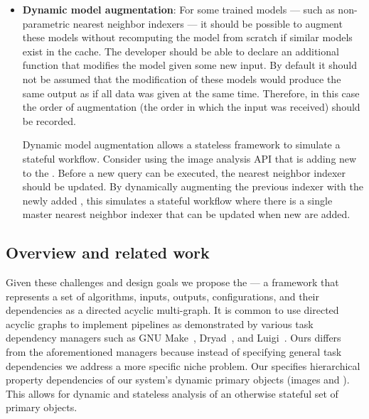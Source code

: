 \begin{itemize}
        \item \textbf{Dynamic model augmentation}:
            For some trained models --- such as non-parametric nearest
              neighbor indexers --- it should be possible to augment these
              models without recomputing the model from scratch if similar
              models exist in the cache.
            The developer should be able to declare an additional function
              that modifies the model given some new input.
            By default it should not be assumed that the modification of these
              models would produce the same output as if all data was given at
              the same time.
            Therefore, in this case the order of augmentation (the order in
              which the input was received) should be recorded.

            Dynamic model augmentation allows a stateless framework to
              simulate a stateful workflow.
            Consider using the image analysis API that is adding new
              \exemplars{} to the \masterdatabase{}.
            Before a new query can be executed, the nearest neighbor indexer
              should be updated.
            By dynamically augmenting the previous indexer with the newly
              added \exemplars{}, this simulates a stateful workflow where there
              is a single master nearest neighbor indexer that can be updated
              when new \exemplars{} are added.
    \end{itemize}

    \subsection{Overview and related work}
    Given these challenges and design goals we propose the
      \glossterm{\depcache{}} --- a framework that represents a set of
      algorithms, inputs, outputs, configurations, and their dependencies as a
      directed acyclic multi-graph.
    It is common to use directed acyclic graphs to implement pipelines as
      demonstrated by various task dependency managers such as GNU
      Make~\cite{stallman_gnu_2004}, Dryad~\cite{isard_dryad_2007}, and
      Luigi~\cite{bernhardsson_luigi_2016}.
    Ours differs from the aforementioned managers because instead of
      specifying general task dependencies we address a more specific niche
      problem.
    Our \depcache{} specifies hierarchical property dependencies of our
      system's dynamic primary objects (images and \annots{}).
    This allows for dynamic and stateless analysis of an otherwise stateful
      set of primary objects.


